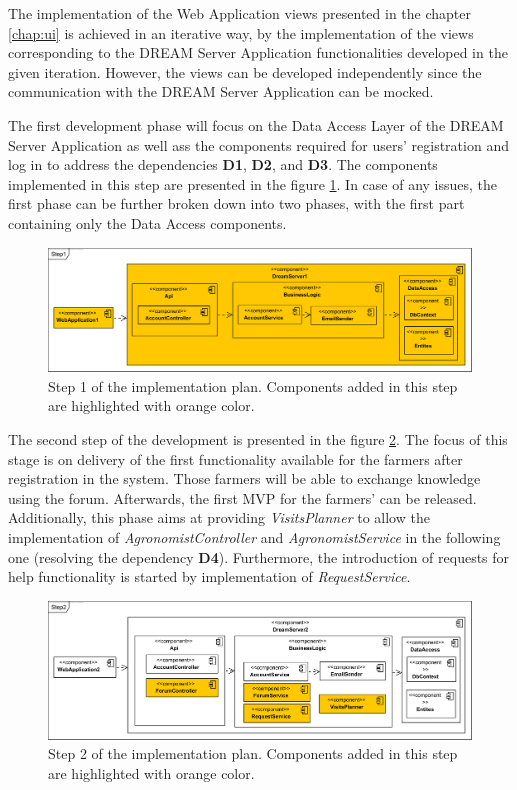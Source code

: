 The implementation of the Web Application views presented in the chapter \ref{chap:ui} is achieved in an iterative way, by the implementation of the views corresponding to the DREAM Server Application functionalities developed in the given iteration. However, the views can be developed independently since the communication with the DREAM Server Application can be mocked. 

The first development phase will focus on the Data Access Layer of the DREAM Server Application as well ass the components required for users' registration and log in to address the dependencies \textbf{D1}, \textbf{D2}, and \textbf{D3}. The components implemented in this step are presented in the figure \ref{fig:step1}. In case of any issues, the first phase can be further broken down into two phases, with the first part containing only the Data Access components.

\begin{figure}[H]
    \centering
    \includegraphics[width=\textwidth]
    {diagrams/implementation-plan/Step1.png}
    \caption{Step 1 of the implementation plan. Components added in this step are highlighted with orange color.}
    \label{fig:step1}
\end{figure}

The second step of the development is presented in the figure \ref{fig:step2}. The focus of this stage is on delivery of the first functionality available for the farmers after registration in the system. Those farmers will be able to exchange knowledge using the forum.  Afterwards, the first MVP for the farmers' can be released. Additionally, this phase aims at providing \textit{VisitsPlanner} to allow the implementation of \textit{AgronomistController} and \textit{AgronomistService} in the following one (resolving the dependency \textbf{D4}). Furthermore, the introduction of requests for help functionality is started by implementation of \textit{RequestService}.

\begin{figure}[H]
    \centering
    \includegraphics[width=\textwidth]
    {diagrams/implementation-plan/Step2.png}
    \caption{Step 2 of the implementation plan. Components added in this step are highlighted with orange color.}
    \label{fig:step2}
\end{figure}

